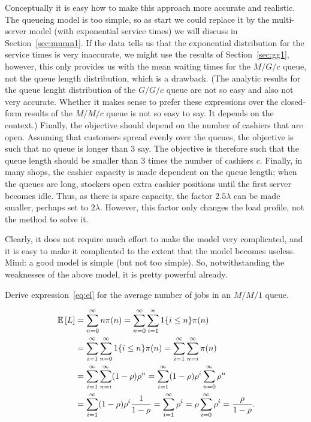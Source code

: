 Conceptually it is easy how to make this approach more accurate and
realistic. The queueing model is too simple, so as start we could
replace it by the multi-server model (with exponential service times)
we will discuss in Section~\ref{sec:mnmn1}. If the data tells us that
the exponential distribution for the service times is very inaccurate,
we might use the results of Section~\ref{sec:gg1}, however, this only
provides us with the mean waiting times for the $M/G/c$ queue, not the
queue length distribution, which is a drawback. (The analytic results
for the queue lenght distribution of the $G/G/c$ queue are not so easy
and also not very accurate. Whether it makes sense to prefer these
expressions over the closed-form results of the $M/M/c$ queue is not
so easy to say. It depends on the context.) Finally, the objective
should depend on the number of cashiers that are open. Assuming that
customers spread evenly over the queues, the objective is such that no
queue is longer than 3 say. The objective is therefore such that the
queue length should be smaller than $3$ times the number of cashiers
$c$. Finally, in many shops, the cashier capacity is made dependent on
the queue length; when the queues are long, stockers open extra
cashier positions until the first server becomes idle. Thus, as there
is spare capacity, the factor $2.5 \lambda$ can be made smaller,
perhaps set to $2\lambda$. However, this factor only changes the load
profile, not the method to solve it.

Clearly, it does not require much effort to make the model very
complicated, and it is easy to make it complicated to the extent that
the model becomes useless. Mind: a good model is simple (but not too
simple). So, notwithstanding the weaknesses of the above model, it is
pretty powerful already. 


\begin{question}
  Derive expression~\ref{eq:el} for the average number of jobs in an
  $M/M/1$ queue.  
  \begin{solution}
    \begin{equation*}
      \begin{split}
\,\mathbb{E}\left[L\right] 
&= \sum_{n=0}^\infty n\pi(n) 
= \sum_{n=0}^\infty \sum_{i=1}^n 1\{i\leq n\} \pi(n) \\        
&= \sum_{i=1}^\infty \sum_{n=0}^\infty  1\{i\leq n\} \pi(n) 
= \sum_{i=1}^\infty \sum_{n=i}^\infty \pi(n) \\
&= \sum_{i=1}^\infty \sum_{n=i}^\infty (1-\rho)\rho^n         
= \sum_{i=1}^\infty (1-\rho)\rho^i \sum_{n=0}^\infty \rho^n \\
&= \sum_{i=1}^\infty (1-\rho)\rho^i \frac1{1-\rho}   
= \sum_{i=1}^\infty \rho^i = \rho \sum_{i=0}^\infty \rho^i = \frac{\rho}{1-\rho}.
      \end{split}
    \end{equation*}
  \end{solution}
\end{question}

